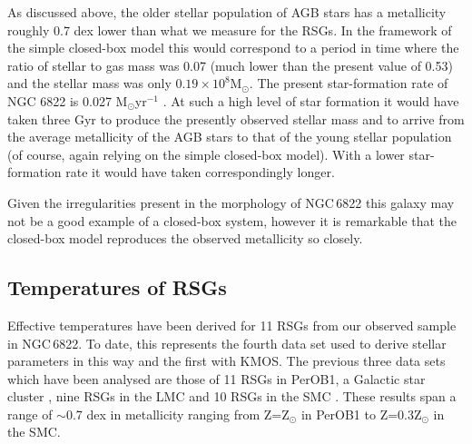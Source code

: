 \documentclass[iop]{emulateapj}
\begin{document}
As discussed above, the older stellar population of AGB stars has a metallicity roughly 0.7 dex lower than what we measure for the RSGs. In the framework of the simple closed-box model this would correspond to a period in time where the ratio of stellar to gas mass was 0.07
(much lower than the present value of 0.53) and the stellar mass was only
$0.19\times10^{8}$M$_{\odot}$.
The present star-formation rate of NGC 6822 is 0.027 M$_{\odot}$yr$^{-1}$
\citep{1996A&A...308..723I,2006ApJ...652.1170C,2010A&A...512A..68G}.
At such a high level of star formation it would have taken three Gyr to produce the presently observed stellar mass and to arrive from the average metallicity of the AGB stars to that of the young stellar population
(of course, again relying on the simple closed-box model).
With a lower star-formation rate it would have taken correspondingly longer.

Given the irregularities present in the morphology of NGC\,6822 this galaxy may not be a good example of a closed-box system, however it is remarkable that the closed-box model reproduces the observed metallicity so closely.





\subsection{Temperatures of RSGs} %
\label{sub:temperatures_of_rsgs}

Effective temperatures have been derived for 11 RSGs from our observed sample in NGC\,6822.
To date, this represents the fourth data set used to derive stellar parameters in this way and the first with KMOS.
The previous three data sets which have been analysed are those of 11 RSGs in PerOB1,
a Galactic star cluster
\citep{2014ApJ...788...58G}, nine RSGs in the LMC and 10 RSGs in the SMC
\citep[both from][]{Davies-prep}.
These results span a range of $\sim$0.7 dex in metallicity ranging from Z=Z$_{\odot}$ in PerOB1 to Z=0.3Z$_{\odot}$ in the SMC.
\end{document}
